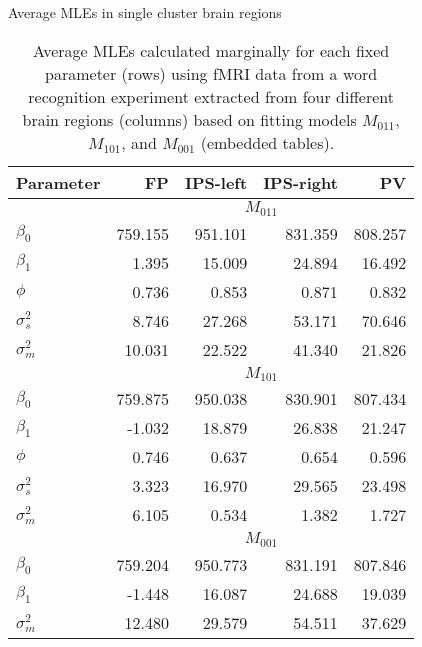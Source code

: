 %

\begin{table}
\ssp
\centering
\caption{Average MLEs in single cluster brain regions} \label{tab:fmri:mle:means}
\begin{tabular}{|l|rrrr|}
\hline
Parameter & FP & IPS-left & IPS-right & PV \\
\hline
 & \multicolumn{4}{|c|}{$M_{011}$} \\
\hline
$\beta_0$ & 759.155 & 951.101 & 831.359 & 808.257 \\
$\beta_1$ & 1.395 & 15.009 & 24.894 & 16.492 \\
$\phi$ & 0.736 & 0.853 & 0.871 & 0.832 \\
$\sigma^2_s$ & 8.746 & 27.268 & 53.171 & 70.646 \\
$\sigma^2_m$ & 10.031 & 22.522 & 41.340 & 21.826 \\
\hline
 & \multicolumn{4}{|c|}{$M_{101}$} \\
\hline
$\beta_0$ & 759.875 & 950.038 & 830.901 & 807.434 \\
$\beta_1$ & -1.032 & 18.879 & 26.838 & 21.247 \\
$\phi$ & 0.746 & 0.637 & 0.654 & 0.596 \\
$\sigma^2_s$ & 3.323 & 16.970 & 29.565 & 23.498 \\
$\sigma^2_m$ & 6.105 & 0.534 & 1.382 & 1.727 \\
\hline
 & \multicolumn{4}{|c|}{$M_{001}$} \\
\hline
$\beta_0$ & 759.204 & 950.773 & 831.191 & 807.846 \\
$\beta_1$ & -1.448 & 16.087 & 24.688 & 19.039 \\
$\sigma^2_m$ & 12.480 & 29.579 & 54.511 & 37.629 \\
\hline
\end{tabular}
\caption*{Average MLEs calculated marginally for each fixed parameter (rows) using fMRI data from a word recognition experiment extracted from four different brain regions (columns) based on fitting models $M_{011}$, $M_{101}$, and $M_{001}$ (embedded tables).}
\end{table}

